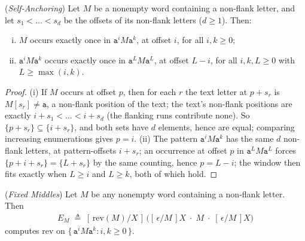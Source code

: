 \documentclass[runningheads,envcountsect]{llncs}
\begin{document}
\begin{lemma}
    (\emph{Self-Anchoring})
    \label{lem:anchor}
    Let $M$ be a nonempty word containing a non-flank letter, and let $s_1 < \dots < s_d$ be the offsets of its non-flank letters ($d \geq 1$). Then:
    \begin{enumerate}[(i)]
        \item $M$ occurs exactly once in $\mathtt a^i M \mathtt a^k$, at offset $i$, for all $i, k \geq 0$;
        \item $\mathtt a^i M \mathtt a^k$ occurs exactly once in $\mathtt a^L M \mathtt a^L$, at offset $L - i$, for all $i, k, L \geq 0$ with $L \geq \max(i, k)$.
    \end{enumerate}
\end{lemma}

\begin{proof}
    (i) If $M$ occurs at offset $p$, then for each $r$ the text letter at $p + s_r$ is $M[s_r] \neq \mathtt a$, a non-flank position of the text; the text's non-flank positions are exactly $i + s_1 < \dots < i + s_d$ (the flanking runs contribute none). So $\{p + s_r\} \subseteq \{i + s_r\}$, and both sets have $d$ elements, hence are equal; comparing increasing enumerations gives $p = i$. (ii) The pattern $\mathtt a^i M \mathtt a^k$ has the same $d$ non-flank letters, at pattern-offsets $i + s_r$; an occurrence at offset $p$ in $\mathtt a^L M \mathtt a^L$ forces $\{p + i + s_r\} = \{L + s_r\}$ by the same counting, hence $p = L - i$; the window then fits exactly when $L \geq i$ and $L \geq k$, both of which hold.
\end{proof}

\begin{theorem}
    (\emph{Fixed Middles})
    \label{thm:fixedmiddle}
    Let $M$ be any nonempty word containing a non-flank letter. Then
    \begin{align*}
        E_M \;\triangleq\; [\,\mathrm{rev}(M)/X\,]\,\big([\,\epsilon/M\,]X \;\cdot\; M \;\cdot\; [\,\epsilon/M\,]X\big)
    \end{align*}
    computes $\mathrm{rev}$ on $\{\, \mathtt a^{i} M \mathtt a^{k} : i, k \geq 0 \,\}$.
\end{theorem}
\end{document}
